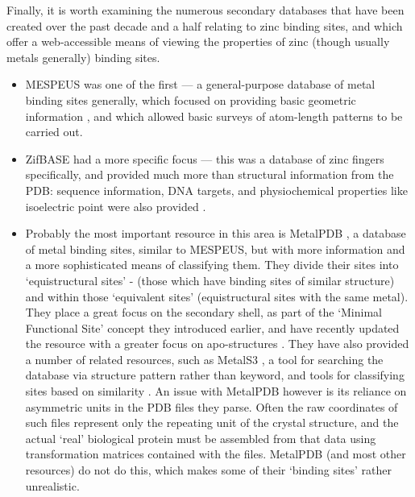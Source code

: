 Finally, it is worth examining the numerous secondary databases that have been created over the past decade and a half relating to zinc binding sites, and which offer a web-accessible means of viewing the properties of zinc (though usually metals generally) binding sites.

\begin{itemize}

\item MESPEUS was one of the first --- a general-purpose database of metal binding sites generally, which focused on providing basic geometric information \cite{hsin2008mespeus}, and which allowed basic surveys of atom-length patterns to be carried out.

\item ZifBASE had a more specific focus --- this was a database of zinc fingers specifically, and provided much more than structural information from the PDB: sequence information, DNA targets, and physiochemical properties like isoelectric point were also provided \cite{jayakanthan2009zifbase}.

\item Probably the most important resource in this area is MetalPDB \cite{andreini2012metalpdb}, a database of metal binding sites, similar to MESPEUS, but with more information and a more sophisticated means of classifying them. They divide their sites into `equistructural sites' - (those which have binding sites of similar structure) and within those `equivalent sites'  (equistructural sites with the same metal). They place a great focus on the secondary shell, as part of the `Minimal Functional Site' concept they introduced earlier, and have recently updated the resource with a greater focus on apo-structures \cite{putignano2017metalpdb}. They have also provided a number of related resources, such as MetalS3 \cite{valasatava2014metals}, a tool for searching the database via structure pattern rather than keyword, and tools for classifying sites based on similarity \cite{sobolev2013web}. An issue with MetalPDB however is its reliance on asymmetric units in the PDB files they parse. Often the raw coordinates of such files represent only the repeating unit of the crystal structure, and the actual `real' biological protein must be assembled from that data using transformation matrices contained with the files. MetalPDB (and most other resources) do not do this, which makes some of their `binding sites' rather unrealistic.

\end{itemize}

